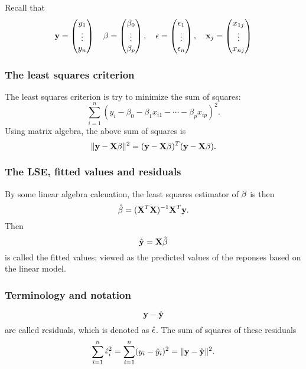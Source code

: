 \documentclass{beamer}
\begin{document}
      
      \begin{frame}
      	\frametitle{ }
      	Recall that
      	\begin{eqnarray*}
      		{\bf y}       =\begin{pmatrix} y_1 \cr\vdots \cr y_n \end{pmatrix} \quad
      		{\bf \beta}   =\begin{pmatrix} \beta_0 \cr\vdots \cr \beta_p \end{pmatrix},  \quad
      		{\bf \epsilon} =\begin{pmatrix} \epsilon_1   \cr\vdots \cr  \epsilon_n \end{pmatrix}, \quad
      		{\bf x}_j      =\begin{pmatrix} x_{1j} \cr \vdots \cr x_{nj}  \end{pmatrix}
      	\end{eqnarray*}
      \end{frame}
      
      
      
      \begin{frame}
      	\frametitle{The least squares criterion}
      	The least squares criterion is try to minimize the sum of squares:
      	$$ \sum_{i=1}^n (y_i -  \beta_0 - \beta_1 x_{i1}-\cdots - \beta_p x_{ip} )^2.$$
      	Using matrix algebra, the above sum of squares is
      	$$ \|{\bf y} - {\bf X} {\bf \beta}\|^2 = ({\bf y} - {\bf X} {\bf \beta})^T({\bf y} - {\bf X} {\bf \beta}).$$
      \end{frame}
      
      
      
      
      \begin{frame}
      	\frametitle{ The LSE, fitted values and residuals}
      	By some linear algebra calcuation,
      	the least squares estimator of $\bf \beta$ is then
      	$$\hat {\bf \beta } = ({\bf X}^T {\bf X} )^{-1} {\bf X}^T {\bf y}.$$
      	Then
      	$$\hat {\bf y} = {\bf X} \hat {\bf \beta}$$
      	is called the fitted values; 
      	viewed as the predicted values of the reponses
      	based on the linear model.
      \end{frame}
      
      \begin{frame}
      	\frametitle{Terminology and notation }
      	
      	$${\bf y} - \hat {\bf y}$$
      	are called residuals, which is denoted as $\hat {\bf \epsilon}$.
      	The sum of squares of these residuals
      	$$ \sum_{i=1}^n \hat \epsilon_i^2 = \sum_{i=1}^n (y_i - \hat y_i)^2
      	= \| {\bf y} - \hat {\bf y}\|^2.$$
      \end{frame}	
      
\end{document}
